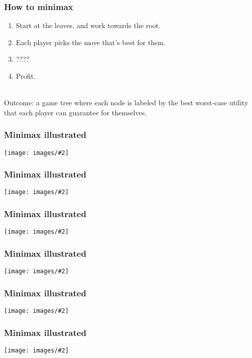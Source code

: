 \documentclass[table]{beamer}
\newcommand\img[2]{\texttt{[image: images/\#2]}}
\begin{document}
\begin{frame}
	\frametitle{How to minimax}
	\begin{enumerate}
		\item Start at the leaves, and work towards the root.
		\item Each player picks the move that's best for them.
		\item ????
		\item Profit.
	\end{enumerate}

	\\[5ex]

	Outcome: a game tree where each node is labeled by the \alert{best
	worst-case} utility that each player can guarantee for themselves.
\end{frame}

\begin{frame}
	\frametitle{Minimax illustrated}
	\begin{center}
		\img{1}{games-1.jpg}
	\end{center}
\end{frame}

\begin{frame}
	\frametitle{Minimax illustrated}
	\begin{center}
		\img{1}{games-2.jpg}
	\end{center}
\end{frame}

\begin{frame}
	\frametitle{Minimax illustrated}
	\begin{center}
		\img{1}{games-3.jpg}
	\end{center}
\end{frame}

\begin{frame}
	\frametitle{Minimax illustrated}
	\begin{center}
		\img{1}{games-4.jpg}
	\end{center}
\end{frame}

\begin{frame}
	\frametitle{Minimax illustrated}
	\begin{center}
		\img{1}{games-5.jpg}
	\end{center}
\end{frame}

\begin{frame}
	\frametitle{Minimax illustrated}
	\begin{center}
		\img{1}{games-6.jpg}
	\end{center}
\end{frame}
\end{document}
